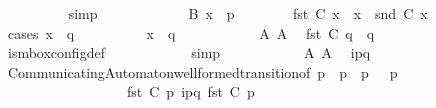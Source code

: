 \begin{isabellebody}
\ \ \ \ \ \ \ \ \isamarkupfalse%
\ simp\isanewline
\ \ \ \ \isamarkupfalse%
\isanewline
\ \ \ \ \ \ \isamarkupfalse%
\ B{\isacharcolon}{\kern0pt}\ {\isachardoublequoteopen}x\ {\isasymnoteq}\ p{\isachardoublequoteclose}\isanewline
\ \ \ \ \ \ \isamarkupfalse%
\ {\isachardoublequoteopen}fst\ {\isacharparenleft}{\kern0pt}C{}\ x{\isacharparenright}{\kern0pt}\ {\isasymin}\ {\isasymS}{\isacharparenleft}{\kern0pt}x{\isacharparenright}{\kern0pt}\ {\isasymand}\ snd\ {\isacharparenleft}{\kern0pt}C{}\ x{\isacharparenright}{\kern0pt}\ {\isasymin}\ {\isasymM}\isactrlsup {\isacharasterisk}{\kern0pt}{\isachardoublequoteclose}\isanewline
\ \ \ \ \ \ \isamarkupfalse%
\ {\isacharparenleft}{\kern0pt}cases\ {\isachardoublequoteopen}x\ {\isacharequal}{\kern0pt}\ q{\isachardoublequoteclose}{\isacharparenright}{\kern0pt}\isanewline
\ \ \ \ \ \ \ \ \isamarkupfalse%
\ {\isachardoublequoteopen}x\ {\isacharequal}{\kern0pt}\ q{\isachardoublequoteclose}\isanewline
\ \ \ \ \ \ \ \ \isamarkupfalse%
\ \isamarkupfalse%
\ A{}\ A{}\ \isamarkupfalse%
\ {\isachardoublequoteopen}fst\ {\isacharparenleft}{\kern0pt}C{}\ q{\isacharparenright}{\kern0pt}\ {\isasymin}\ {\isasymS}{\isacharparenleft}{\kern0pt}q{\isacharparenright}{\kern0pt}{\isachardoublequoteclose}\isanewline
\ \ \ \ \ \ \ \ \ \ \isamarkupfalse%
\ is{\isacharunderscore}{\kern0pt}mbox{\isacharunderscore}{\kern0pt}config{\isacharunderscore}{\kern0pt}def\isanewline
\ \ \ \ \ \ \ \ \ \ \isamarkupfalse%
\ simp\isanewline
\ \ \ \ \ \ \ \ \isamarkupfalse%
\ \isamarkupfalse%
\ A{}\ A{}\ \isamarkupfalse%
\ {\isachardoublequoteopen}i\isactrlbsup p{\isasymrightarrow}q\isactrlesup \ {\isasymin}\ {\isasymM}{\isachardoublequoteclose}\isanewline
\ \ \ \ \ \ \ \ \ \ \isamarkupfalse%
\ CommunicatingAutomaton{\isachardot}{\kern0pt}well{\isacharunderscore}{\kern0pt}formed{\isacharunderscore}{\kern0pt}transition{\isacharbrackleft}{\kern0pt}of\ p\ {\isachardoublequoteopen}{\isasymS}\ p{\isachardoublequoteclose}\ {\isachardoublequoteopen}{\isasymI}\ p{\isachardoublequoteclose}\ {\isasymM}\ {\isachardoublequoteopen}{\isasymR}\ p{\isachardoublequoteclose}\isanewline
\ \ \ \ \ \ \ \ \ \ \ \ \ \ \ \ \ \ {\isachardoublequoteopen}fst\ {\isacharparenleft}{\kern0pt}C{}\ p{\isacharparenright}{\kern0pt}{\isachardoublequoteclose}\ {\isachardoublequoteopen}{\isacharbang}{\kern0pt}{\isasymlangle}{\isacharparenleft}{\kern0pt}i\isactrlbsup p{\isasymrightarrow}q\isactrlesup {\isacharparenright}{\kern0pt}{\isasymrangle}{\isachardoublequoteclose}\ {\isachardoublequoteopen}fst\ {\isacharparenleft}{\kern0pt}C{}\ p{\isacharparenright}{\kern0pt}{\isachardoublequoteclose}{\isacharbrackright}{\kern0pt}\isanewline

\end{isabellebody}
